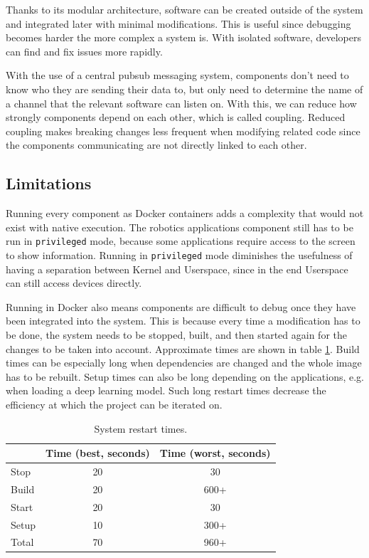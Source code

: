 Thanks to its modular architecture, software can be created outside of the system and integrated later with minimal modifications. This is useful since debugging becomes harder the more complex a system is. With isolated software, developers can find and fix issues more rapidly.

With the use of a central \Gls{pubsub} messaging system, components don't need to know who they are sending their data to, but only need to determine the name of a channel that the relevant software can listen on. With this, we can reduce how strongly components depend on each other, which is called coupling. Reduced coupling makes breaking changes less frequent when modifying related code since the components communicating are not directly linked to each other.


\subsection{Limitations}

Running every component as Docker containers adds a complexity that would not exist with native execution. The robotics applications component still has to be run in \lstinline{privileged} mode, because some applications require access to the screen to show information. Running in \lstinline{privileged} mode diminishes the usefulness of having a separation between Kernel and Userspace, since in the end Userspace can still access devices directly.

Running in Docker also means components are difficult to debug once they have been integrated into the system. This is because every time a modification has to be done, the system needs to be stopped, built, and then started again for the changes to be taken into account. Approximate times are shown in table \ref{table:restart_times_docker}. Build times can be especially long when dependencies are changed and the whole image has to be rebuilt. Setup times can also be long depending on the applications, e.g. when loading a deep learning model. Such long restart times decrease the efficiency at which the project can be iterated on.

\begin{table}[ht]
  \centering
  \caption{System restart times.}
  \label{table:restart_times_docker}
  \begin{tabular}[t]{lcc}
    \hline
                  & Time (best, seconds) & Time (worst, seconds) \\
    \hline
    Stop      & 20           & 30           \\
    Build     & 20           & 600+         \\
    Start     & 20           & 30           \\
    Setup     & 10           & 300+         \\
    \hline
    Total     & 70           & 960+         \\
    \hline
  \end{tabular}
\end{table}%

